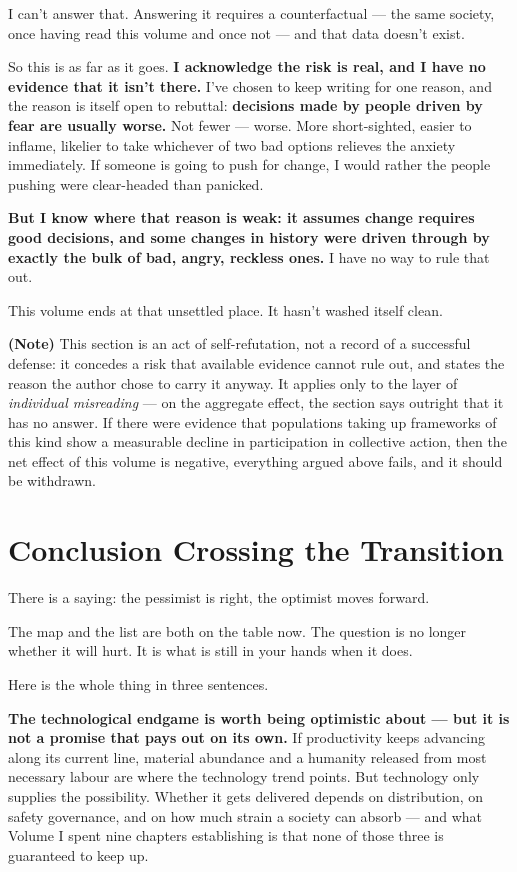 \documentclass[11pt,a4paper]{article}
\begin{document}
I can't answer that. Answering it requires a counterfactual --- the same society, once having read this volume and once not --- and that data doesn't exist.

So this is as far as it goes. \textbf{I acknowledge the risk is real, and I have no evidence that it isn't there.} I've chosen to keep writing for one reason, and the reason is itself open to rebuttal: \textbf{decisions made by people driven by fear are usually worse.} Not fewer --- worse. More short-sighted, easier to inflame, likelier to take whichever of two bad options relieves the anxiety immediately. If someone is going to push for change, I would rather the people pushing were clear-headed than panicked.

\textbf{But I know where that reason is weak: it assumes change requires good decisions, and some changes in history were driven through by exactly the bulk of bad, angry, reckless ones.} I have no way to rule that out.

This volume ends at that unsettled place. It hasn't washed itself clean.

\textbf{(Note)} This section is an act of self-refutation, not a record of a successful defense: it concedes a risk that available evidence cannot rule out, and states the reason the author chose to carry it anyway. It applies only to the layer of \textit{individual misreading} --- on the aggregate effect, the section says outright that it has no answer. If there were evidence that populations taking up frameworks of this kind show a measurable decline in participation in collective action, then the net effect of this volume is negative, everything argued above fails, and it should be withdrawn.

\section{Conclusion \textperiodcentered{} Crossing the Transition}

There is a saying: the pessimist is right, the optimist moves forward.

The map and the list are both on the table now. The question is no longer whether it will hurt. It is what is still in your hands when it does.

Here is the whole thing in three sentences.

\textbf{The technological endgame is worth being optimistic about --- but it is not a promise that pays out on its own.} If productivity keeps advancing along its current line, material abundance and a humanity released from most necessary labour are where the technology trend points. But technology only supplies the possibility. Whether it gets delivered depends on distribution, on safety governance, and on how much strain a society can absorb --- and what Volume I spent nine chapters establishing is that none of those three is guaranteed to keep up.
\end{document}
